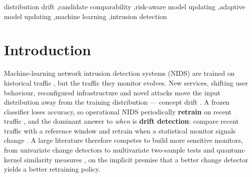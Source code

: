 \documentclass[a4paper,fleqn]{cas-sc}
\begin{document}
\begin{keywords}
distribution drift \sep candidate comparability \sep risk-aware model updating \sep adaptive model updating \sep machine learning \sep intrusion detection
\end{keywords}

\maketitle
\hypersetup{pageanchor=true}


\section{Introduction}


Machine-learning network intrusion detection systems (NIDS) are trained on historical traffic \cite{nguyen2023tsids}, but the traffic they monitor evolves. New services, shifting user behaviour, reconfigured infrastructure and novel attacks move the input distribution away from the training distribution --- concept drift \cite{shyaa2024evolving,wahab2022intrusion,roshan2018adaptive}. A frozen classifier loses accuracy, so operational NIDS periodically \textbf{retrain} on recent traffic \cite{wahab2022intrusion,camarda2025managing,constantinides2019novel}, and the dominant answer to \emph{when} is \textbf{drift detection}: compare recent traffic with a reference window and retrain when a statistical monitor signals change \cite{gama2004learning,rabanser2019failing,lukats2024benchmark}. A large literature therefore competes to build more sensitive monitors, from univariate change detectors to multivariate two-sample tests \cite{gretton2012kernel,szekely2013energy} and quantum-kernel similarity measures \cite{havlicek2019supervised,schuld2019quantum,kaissar2026enhancing}, on the implicit premise that a better change detector yields a better retraining policy.
\end{document}
